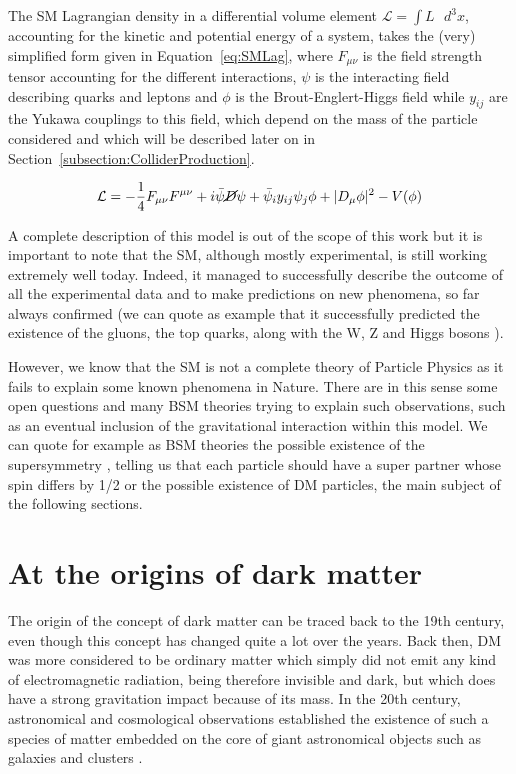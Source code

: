 \documentclass[a4paper, 10pt, openright]{report}
\begin{document}
The \ac{SM} Lagrangian density in a differential volume element $\mathcal{L} = \int L \text{ } d^3x$, accounting for the kinetic and potential energy of a system, takes the (very) simplified form given in Equation~\ref{eq:SMLag}, where $F_{\mu \nu}$ is the field strength tensor accounting for the different interactions, $\psi$ is the interacting field describing quarks and leptons and $\phi$ is the Brout-Englert-Higgs field while $y_{ij}$ are the Yukawa couplings to this field, which depend on the mass of the particle considered and which will be described later on in Section~\ref{subsection:ColliderProduction}.

\begin{equation}
\mathcal{L} = - \frac{1}{4} F_{\mu \nu} F^{\mu \nu} + i \bar{\psi} \cancel{D} \psi + \bar{\psi}_i y_{ij} \psi_j \phi + |D_\mu \phi|^2 - V(\phi)
\label{eq:SMLag}
\end{equation}

A complete description of this model is out of the scope of this work but it is important to note that the \ac{SM}, although mostly experimental, is still working extremely well today. Indeed, it managed to successfully describe the outcome of all the experimental data and to make predictions on new phenomena, so far always confirmed (we can quote as example that it successfully predicted the existence of the gluons, the top quarks, along with the W, Z and Higgs bosons \cite{SMPredictions}).

However, we know that the \ac{SM} is not a complete theory of Particle Physics as it fails to explain some known phenomena in Nature. There are in this sense some open questions and many \ac{BSM} theories trying to explain such observations, such as an eventual inclusion of the gravitational interaction within this model. We can quote for example as \ac{BSM} theories the possible existence of the supersymmetry \cite{SUSY}, telling us that each particle should have a super partner whose spin differs by 1/2 or the possible existence of \ac{DM} particles, the main subject of the following sections.

\section{At the origins of dark matter} \label{section:DMOrigins}

The origin of the concept of dark matter can be traced back to the 19th century, even though this concept has changed quite a lot over the years. Back then, \ac{DM} was more considered to be ordinary matter which simply did not emit any kind of electromagnetic radiation, being therefore invisible and dark, but which does have a strong gravitation impact because of its mass. In the 20th century, astronomical and cosmological observations established the existence of such a species of matter embedded on the core of giant astronomical objects such as galaxies and clusters \cite{Poincare}.
\end{document}
